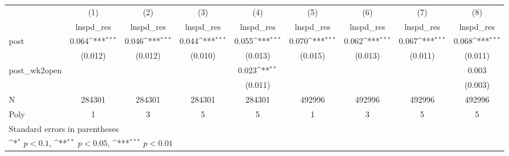 {
\def\sym#1{\ifmmode^{#1}\else\(^{#1}\)\fi}
\begin{tabular}{l*{8}{c}}
\hline\hline
            &\multicolumn{1}{c}{(1)}&\multicolumn{1}{c}{(2)}&\multicolumn{1}{c}{(3)}&\multicolumn{1}{c}{(4)}&\multicolumn{1}{c}{(5)}&\multicolumn{1}{c}{(6)}&\multicolumn{1}{c}{(7)}&\multicolumn{1}{c}{(8)}\\
            &\multicolumn{1}{c}{lnspd\_res}&\multicolumn{1}{c}{lnspd\_res}&\multicolumn{1}{c}{lnspd\_res}&\multicolumn{1}{c}{lnspd\_res}&\multicolumn{1}{c}{lnspd\_res}&\multicolumn{1}{c}{lnspd\_res}&\multicolumn{1}{c}{lnspd\_res}&\multicolumn{1}{c}{lnspd\_res}\\
\hline
post        &  0.064\sym{***}&  0.046\sym{***}&  0.044\sym{***}&  0.055\sym{***}&  0.070\sym{***}&  0.062\sym{***}&  0.067\sym{***}&  0.068\sym{***}\\
            &(0.012)         &(0.012)         &(0.010)         &(0.013)         &(0.015)         &(0.013)         &(0.011)         &(0.011)         \\
[1em]
post\_wk2open&                &                &                &  0.023\sym{**} &                &                &                &  0.003         \\
            &                &                &                &(0.011)         &                &                &                &(0.003)         \\
\hline
N           & 284301         & 284301         & 284301         & 284301         & 492996         & 492996         & 492996         & 492996         \\
Poly        &      1         &      3         &      5         &      5         &      1         &      3         &      5         &      5         \\
\hline\hline
\multicolumn{9}{l}{\footnotesize Standard errors in parentheses}\\
\multicolumn{9}{l}{\footnotesize \sym{*} \(p<0.1\), \sym{**} \(p<0.05\), \sym{***} \(p<0.01\)}\\
\end{tabular}
}
